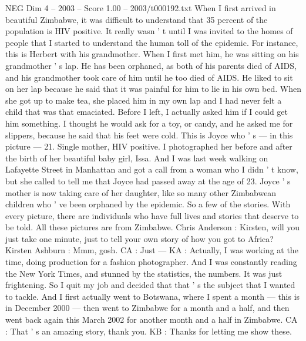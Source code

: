 \begin{textsample}{NEG Dim 4 – 2003 – Score 1.00 – 2003/t000192.txt}  \label{ex:f4_neg_046}
When I first arrived in beautiful Zimbabwe, it was difficult to understand that 35 percent of the population is HIV positive.
It really wasn ' t until I was invited to the homes of people that I started to understand the human toll of the epidemic.
For instance, this is Herbert with his grandmother.
When I first met him, he was sitting on his grandmother ' s lap.
He has been orphaned, as both of his parents died of AIDS, and his grandmother took care of him until he too died of AIDS.
He liked to sit on her lap because he said that it was painful for him to lie in his own bed.
When she got up to make tea, she placed him in my own lap and I had never felt a child that was that emaciated.
Before I left, I actually asked him if I could get him something.
I thought he would ask for a toy, or candy, and he asked me for slippers, because he said that his feet were cold.
This is Joyce who ' s — in this picture — 21.
Single mother, HIV positive.
I photographed her before and after the birth of her beautiful baby girl, Issa.
And I was last week walking on Lafayette Street in Manhattan and got a call from a woman who I didn ' t know, but she called to tell me that Joyce had passed away at the age of 23.
Joyce ' s mother is now taking care of her daughter, like so many other Zimbabwean children who ' ve been orphaned by the epidemic.
So a few of the stories.
With every picture, there are individuals who have full lives and stories that deserve to be told.
All these pictures are from Zimbabwe.
Chris Anderson : Kirsten, will you just take one minute, just to tell your own story of how you got to Africa?
Kirsten Ashburn : Mmm, gosh.
CA : Just — KA : Actually, I was working at the time, doing production for a fashion photographer.
And I was constantly reading the New York Times, and stunned by the statistics, the numbers.
It was just frightening.
So I quit my job and decided that that ' s the subject that I wanted to tackle.
And I first actually went to Botswana, where I spent a month — this is in December 2000 — then went to Zimbabwe for a month and a half, and then went back again this March 2002 for another month and a half in Zimbabwe.
CA : That ' s an amazing story, thank you.
KB : Thanks for letting me show these.

\end{textsample}
